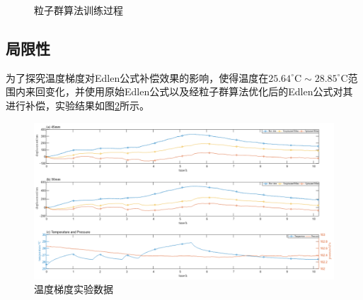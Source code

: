 \begin{figure}[htb]
  \centering
  \caption{粒子群算法训练过程}
  \label{fig:粒子群算法训练过程}
\end{figure}

\subsection{局限性}
为了探究温度梯度对Edlen公式补偿效果的影响，使得温度在$25.64^{\circ} \mathrm{C}\sim28.85^{\circ} \mathrm{C}$范围内来回变化，并使用原始Edlen公式以及经粒子群算法优化后的Edlen公式对其进行补偿，实验结果如图\ref{fig:温度梯度实验数据}所示。
\begin{figure}[htb]
  \centering
  \includegraphics[width=14cm]{fig/4-fig/温度梯度实验数据.jpg}
  \caption{温度梯度实验数据}
  \label{fig:温度梯度实验数据}
\end{figure}

